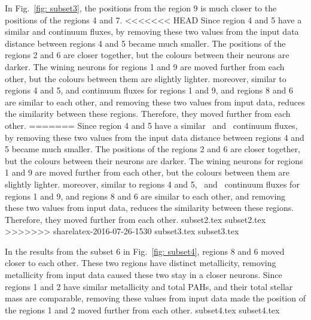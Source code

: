         In Fig.~\ref{fig: subset3}, the positions from the region 9 is much closer to the positions of the regions 4 and 7. 
<<<<<<< HEAD
        Since region 4 and 5 have a similar \oiii and \sii continuum fluxes, by removing these two values from the input data distance between regions 4 and 5 became much smaller.
        The positions of the regions 2 and 6 are closer together, but the colours between their neurons are darker.
        The wining neurons for regions 1 and 9 are moved further from each other, but the colours between them are slightly lighter. 
        moreover, similar to regions 4 and 5, \oiii and \sii continuum fluxes for regions 1 and 9, and regions 8 and 6 are similar to each other, and removing these two values from input data, reduces the similarity between these regions. Therefore, they moved further from each other. 
=======
        Since region 4 and 5 have a similar \oiii~and \sii~continuum fluxes, by removing these two values from the input data distance between regions 4 and 5 became much smaller.
        The positions of the regions 2 and 6 are closer together, but the colours between their neurons are darker.
        The wining neurons for regions 1 and 9 are moved further from each other, but the colours between them are slightly lighter. 
        moreover, similar to regions 4 and 5, \oiii~and \sii~continuum fluxes for regions 1 and 9, and regions 8 and 6 are similar to each other, and removing these two values from input data, reduces the similarity between these regions. Therefore, they moved further from each other. 
         {subset2.tex}
        {subset2.tex}
>>>>>>> sharelatex-2016-07-26-1530
        {subset3.tex}
        {subset3.tex}
        
        In the results from the subset 6 in Fig.~\ref{fig: subset4}, regions 8 and 6 moved closer to each other. 
        These two regions have distinct metallicity, removing metallicity from input data caused these two stay in a closer neurons. 
        Since regions 1 and 2 have similar metallicity and total PAHs, and their total stellar mass are comparable, removing these values from input data made the position of the regions 1 and 2 moved further from each other. 
        {subset4.tex}
        {subset4.tex}
        
